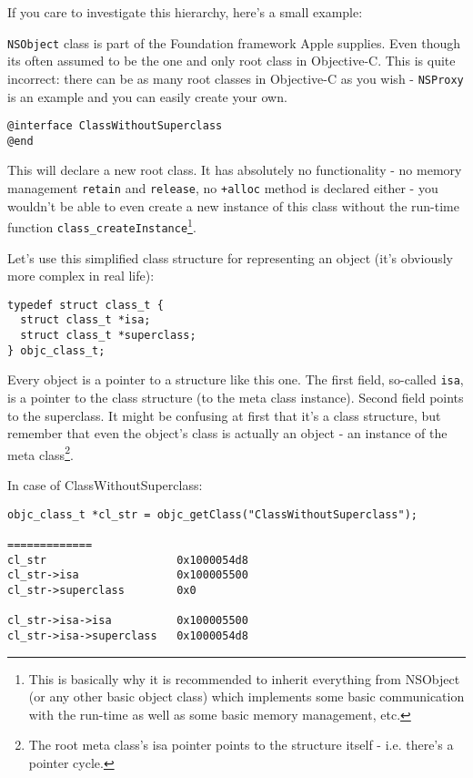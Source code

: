 \documentclass[a4paper, 11pt, fleqn]{book}
\begin{document}
If you care to investigate this hierarchy, here's a small example:

\verb=NSObject= class is part of the Foundation framework Apple supplies. Even though its often assumed to be the one and only root class in Objective-C. This is quite incorrect: there can be as many root classes in Objective-C as you wish - \verb=NSProxy= is an example and you can easily create your own.

\begin{verbatim}@interface ClassWithoutSuperclass
@end\end{verbatim}

This will declare a new root class. It has absolutely no functionality - no memory management \verb=retain= and \verb=release=, no \verb=+alloc= method is declared either - you wouldn't be able to even create a new instance of this class without the run-time function \verb=class_createInstance=\footnote{This is basically why it is recommended to inherit everything from NSObject (or any other basic object class) which implements some basic communication with the run-time as well as some basic memory management, etc.}.

Let's use this simplified class structure for representing an object (it's obviously more complex in real life):

\begin{verbatim}
typedef struct class_t {
  struct class_t *isa;
  struct class_t *superclass;
} objc_class_t;
\end{verbatim}

Every object is a pointer to a structure like this one. The first field, so-called \verb=isa=, is a pointer to the class structure (to the meta class instance). Second field points to the superclass. It might be confusing at first that it's a class structure, but remember that even the object's class is actually an object - an instance of the meta class\footnote{The root meta class's isa pointer points to the structure itself - i.e. there's a pointer cycle.}.

In case of ClassWithoutSuperclass:

\begin{verbatim}
objc_class_t *cl_str = objc_getClass("ClassWithoutSuperclass");

=============
cl_str                    0x1000054d8
cl_str->isa               0x100005500
cl_str->superclass        0x0

cl_str->isa->isa          0x100005500
cl_str->isa->superclass   0x1000054d8
\end{verbatim}
\end{document}
